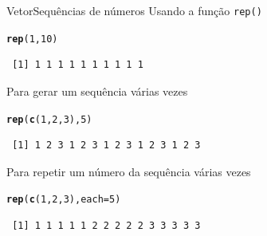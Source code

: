 \documentclass[10pt,handout]{beamer}\usepackage[]{graphicx}\usepackage[]{color}
\makeatletter
\newcommand{\hlnum}[1]{\textcolor[rgb]{0.686,0.059,0.569}{#1}}%
\newcommand{\hlstd}[1]{\textcolor[rgb]{0.345,0.345,0.345}{#1}}%
\newcommand{\hlkwc}[1]{\textcolor[rgb]{0.333,0.667,0.333}{#1}}%
\newcommand{\hlkwd}[1]{\textcolor[rgb]{0.737,0.353,0.396}{\textbf{#1}}}%
\newenvironment{kframe}{%
 \def\at@end@of@kframe{}%
 \ifinner\ifhmode%
  \def\at@end@of@kframe{\end{minipage}}%
  \begin{minipage}{\columnwidth}%
 \fi\fi%
 \def\FrameCommand##1{\hskip\@totalleftmargin \hskip-\fboxsep
 \colorbox{shadecolor}{##1}\hskip-\fboxsep
     \hskip-\linewidth \hskip-\@totalleftmargin \hskip\columnwidth}%
 \MakeFramed {\advance\hsize-\width
   \@totalleftmargin\z@ \linewidth\hsize
   \@setminipage}}%
 {\par\unskip\endMakeFramed%
 \at@end@of@kframe}
\newenvironment{knitrout}{}{} %
\makeatother
\begin{document}
\begin{frame}[fragile]{Vetor}{Sequências de números}
  Usando a função \verb|rep()|
\begin{knitrout}\small
{}\color{fgcolor}\begin{kframe}
\begin{alltt}
\hlkwd{rep}\hlstd{(}\hlnum{1}\hlstd{,} \hlnum{10}\hlstd{)}
\end{alltt}
\begin{verbatim}
 [1] 1 1 1 1 1 1 1 1 1 1
\end{verbatim}
\end{kframe}
\end{knitrout}
Para gerar um sequência várias vezes
\begin{knitrout}\small
{}\color{fgcolor}\begin{kframe}
\begin{alltt}
\hlkwd{rep}\hlstd{(}\hlkwd{c}\hlstd{(}\hlnum{1}\hlstd{,} \hlnum{2}\hlstd{,} \hlnum{3}\hlstd{),} \hlnum{5}\hlstd{)}
\end{alltt}
\begin{verbatim}
 [1] 1 2 3 1 2 3 1 2 3 1 2 3 1 2 3
\end{verbatim}
\end{kframe}
\end{knitrout}
Para repetir um número da sequência várias vezes
\begin{knitrout}\small
{}\color{fgcolor}\begin{kframe}
\begin{alltt}
\hlkwd{rep}\hlstd{(}\hlkwd{c}\hlstd{(}\hlnum{1}\hlstd{,} \hlnum{2}\hlstd{,} \hlnum{3}\hlstd{),} \hlkwc{each} \hlstd{=} \hlnum{5}\hlstd{)}
\end{alltt}
\begin{verbatim}
 [1] 1 1 1 1 1 2 2 2 2 2 3 3 3 3 3
\end{verbatim}
\end{kframe}
\end{knitrout}
\end{frame}
\end{document}
